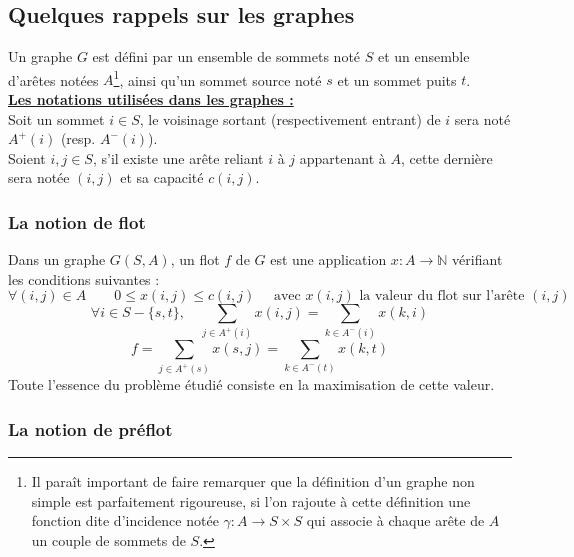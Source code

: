 \subsection{Quelques rappels sur les graphes}

Un graphe $G$ est défini par un ensemble de sommets noté $S$ et un ensemble d'arêtes notées
$A$\footnote{\samepage Il paraît important de faire remarquer que la définition d'un graphe non simple est
	parfaitement rigoureuse, si l'on rajoute à cette définition une fonction dite d'incidence notée
	$\gamma : A \rightarrow S \times S$ qui associe à chaque arête de $A$ un couple de sommets de
$S$.}, ainsi qu'un sommet source noté $s$ et un sommet puits $t$.\\

\textbf{\underline{Les notations utilisées dans les graphes :}}\\

Soit un sommet $i \in S$, le voisinage sortant (respectivement entrant) de $i$ sera noté $A^+(i)$
(resp. $A^-(i)$).\\
Soient $i, j \in S$, s'il existe une arête reliant $i$ à $j$ appartenant à $A$, cette dernière sera
notée $(i,j)$ et sa capacité $c(i,j)$.

\subsubsection{La notion de flot}

Dans un graphe $G (S, A)$, un flot $f$ de $G$ est une application $x : A \rightarrow \mathbb{N}$
vérifiant les conditions suivantes : 
		\begin{equation}
			\label{flot_1}
			\forall (i,j) \in A \qquad 0 \leq x(i,j) \leq c(i,j)\quad \mbox{ avec }x(i,j)\mbox{ la valeur du flot sur
			l'arête }(i,j)
		\end{equation} 
		\begin{equation} 
			\label{flot_2}
			\forall i \in S - \{s,t\},\quad \sum_{j \in A^+(i)} x(i,j) = \sum_{k \in A^-(i)} x(k,i)
		\end{equation}
		\begin{equation}
			\label{flot_3}
			f = \sum_{j \in A^+(s)} x(s,j) = \sum_{k \in A^-(t)} x(k, t)
		\end{equation}
Toute l'essence du problème étudié consiste en la maximisation de cette valeur.

\subsubsection{La notion de préflot}


